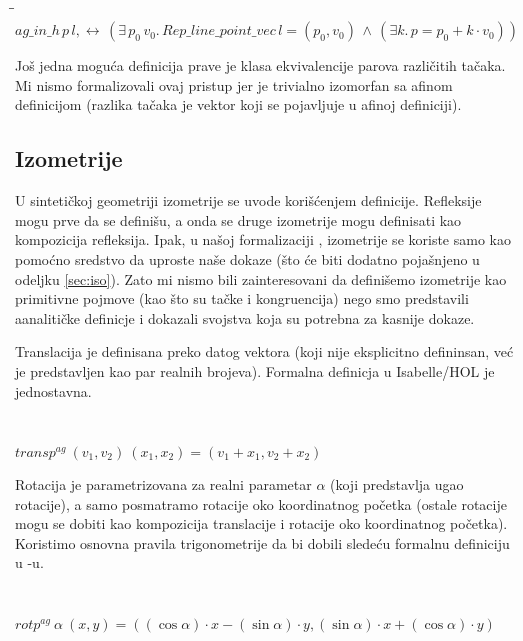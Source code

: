 \documentclass[a4paper, 12pt]{article}
\newcommand{\agtransp}[2]{\ensuremath{transp^{ag}\ #1\ #2}}
\newcommand{\agrotp}[2]{\ensuremath{rotp^{ag}\ #1\ #2}}
\begin{document}
{\tt
\begin{tabbing}
\hspace{5mm}\=\hspace{5mm}\=\kill
$ag\_in\_h\,p\,l,\longleftrightarrow\,(\exists\,p_0\,v_0.\,\mathit{Rep\_line\_point\_vec}\,l = (p_0, v_0) \,\wedge\,  (\exists k.\,p = p_0 + k \cdot v_0))$
\end{tabbing}
}

Jo\v s jedna mogu\'ca definicija prave je klasa ekvivalencije parova
razli\v citih ta\v caka. Mi nismo formalizovali ovaj pristup jer je
trivialno izomorfan sa afinom definicijom (razlika ta\v caka je vektor
koji se pojavljuje u afinoj definiciji).

\subsection{Izometrije}

U sinteti\v ckoj geometriji izometrije se uvode kori\v s\'cenjem
definicije. Refleksije mogu prve da se defini\v su, a onda se
druge izometrije mogu definisati kao kompozicija refleksija. Ipak,
u na\v soj formalizaciji , izometrije se koriste samo kao
pomo\'cno sredstvo da uproste na\v se dokaze (\v sto \'ce biti
dodatno poja\v snjeno u odeljku \ref{sec:iso}). Zato mi nismo bili
zainteresovani da defini\v semo izometrije kao primitivne pojmove
(kao \v sto su ta\v cke i kongruencija) nego smo predstavili
aanaliti\v cke definicje i dokazali svojstva koja su potrebna za
kasnije dokaze.

Translacija je definisana preko datog vektora (koji nije
eksplicitno defininsan, ve\'c je predstavljen kao par realnih
brojeva). Formalna definicja u {\lat Isabelle/HOL } je
jednostavna.

{\tt
\begin{tabbing}
$\agtransp{(v_1, v_2)}{(x_1, x_2)} = (v_1 + x_1, v_2 + x_2)$
\end{tabbing}
}

Rotacija je parametrizovana za realni parametar $\alpha$ (koji
predstavlja ugao rotacije), a samo posmatramo rotacije oko
koordinatnog po\v cetka (ostale rotacije mogu se dobiti kao
kompozicija translacije i rotacije oko koordinatnog po\v cetka).
Koristimo osnovna pravila trigonometrije da bi dobili slede\'cu
formalnu definiciju u -u.

{\tt
\begin{tabbing}
$\agrotp{\alpha}{(x, y)} = ((\cos \alpha)\cdot x - (\sin
\alpha)\cdot y , (\sin \alpha)\cdot x + (\cos \alpha)\cdot y)$
\end{tabbing}
}
\end{document}
